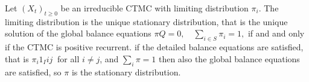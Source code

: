  Let $(X_t)_{t \ge 0}$ be an irreducible CTMC with limiting distribution $\pi_i$. The limiting distribution is the unique stationary distribution, that is the unique solution of the global balance equations 
$\pi Q = 0, \quad \sum_{i \in S} \pi_i = 1,$ 
if and  and only if the CTMC is positive recurrent.
 if the detailed balance equations are satisfied, that is 
$\pi_i 1_I{ij} \ $ for all $i \ne j$, and $\sum_i \pi = 1$ then also the global balance equations are satisfied, so $\pi$ is the stationary distribution.
